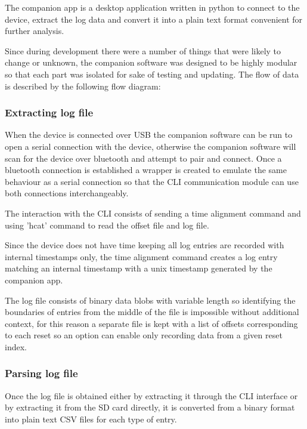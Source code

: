 The companion app is a desktop application written in python to connect to the device, extract the log data and convert it into a plain text format convenient for further analysis.

Since during development there were a number of things that were likely to change or unknown, the companion software was designed to be highly modular so that each part was isolated for sake of testing and updating.  The flow of data is described by the following flow diagram:


\subsubsection{Extracting log file}

When the device is connected over USB the companion software can be run to open a serial connection with the device, otherwise the companion software will scan for the device over bluetooth and attempt to pair and connect.  Once a bluetooth connection is established a wrapper is created to emulate the same behaviour as a serial connection so that the CLI communication module can use both connections interchangeably.

The interaction with the CLI consists of sending a time alignment command and using 'hcat' command to read the offset file and log file.  

Since the device does not have time keeping all log entries are recorded with internal timestamps only, the time alignment command creates a log entry matching an internal timestamp with a unix timestamp generated by the companion app.  

The log file consists of binary data blobs with variable length so identifying the boundaries of entries from the middle of the file is impossible without additional context, for this reason a separate file is kept with a list of offsets corresponding to each reset so an option can enable only recording data from a given reset index.

\subsubsection{Parsing log file}

Once the log file is obtained either by extracting it through the CLI interface or by extracting it from the SD card directly, it is converted from a binary format into plain text CSV files for each type of entry.

